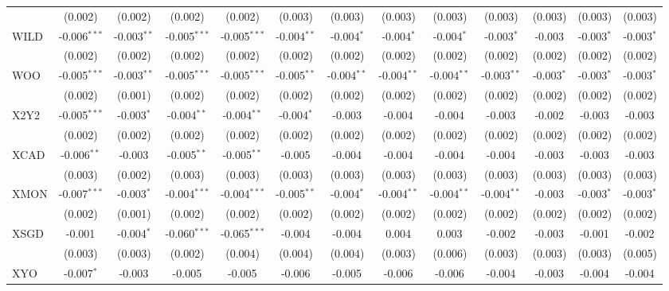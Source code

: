 \begin{table}[!htbp]
\begin{tabular}{@{\extracolsep{5pt}}lcccccccccccc}
  & (0.002) & (0.002) & (0.002) & (0.002) & (0.003) & (0.003) & (0.003) & (0.003) & (0.003) & (0.003) & (0.003) & (0.003) \\
 WILD & -0.006$^{***}$ & -0.003$^{**}$ & -0.005$^{***}$ & -0.005$^{***}$ & -0.004$^{**}$ & -0.004$^{*}$ & -0.004$^{*}$ & -0.004$^{*}$ & -0.003$^{*}$ & -0.003$^{}$ & -0.003$^{*}$ & -0.003$^{*}$ \\
  & (0.002) & (0.002) & (0.002) & (0.002) & (0.002) & (0.002) & (0.002) & (0.002) & (0.002) & (0.002) & (0.002) & (0.002) \\
 WOO & -0.005$^{***}$ & -0.003$^{**}$ & -0.005$^{***}$ & -0.005$^{***}$ & -0.005$^{**}$ & -0.004$^{**}$ & -0.004$^{**}$ & -0.004$^{**}$ & -0.003$^{**}$ & -0.003$^{*}$ & -0.003$^{*}$ & -0.003$^{*}$ \\
  & (0.002) & (0.001) & (0.002) & (0.002) & (0.002) & (0.002) & (0.002) & (0.002) & (0.002) & (0.002) & (0.002) & (0.002) \\
 X2Y2 & -0.005$^{***}$ & -0.003$^{*}$ & -0.004$^{**}$ & -0.004$^{**}$ & -0.004$^{*}$ & -0.003$^{}$ & -0.004$^{}$ & -0.004$^{}$ & -0.003$^{}$ & -0.002$^{}$ & -0.003$^{}$ & -0.003$^{}$ \\
  & (0.002) & (0.002) & (0.002) & (0.002) & (0.002) & (0.002) & (0.002) & (0.002) & (0.002) & (0.002) & (0.002) & (0.002) \\
 XCAD & -0.006$^{**}$ & -0.003$^{}$ & -0.005$^{**}$ & -0.005$^{**}$ & -0.005$^{}$ & -0.004$^{}$ & -0.004$^{}$ & -0.004$^{}$ & -0.004$^{}$ & -0.003$^{}$ & -0.003$^{}$ & -0.003$^{}$ \\
  & (0.003) & (0.002) & (0.003) & (0.003) & (0.003) & (0.003) & (0.003) & (0.003) & (0.003) & (0.003) & (0.003) & (0.003) \\
 XMON & -0.007$^{***}$ & -0.003$^{*}$ & -0.004$^{***}$ & -0.004$^{***}$ & -0.005$^{**}$ & -0.004$^{*}$ & -0.004$^{**}$ & -0.004$^{**}$ & -0.004$^{**}$ & -0.003$^{}$ & -0.003$^{*}$ & -0.003$^{*}$ \\
  & (0.002) & (0.001) & (0.002) & (0.002) & (0.002) & (0.002) & (0.002) & (0.002) & (0.002) & (0.002) & (0.002) & (0.002) \\
 XSGD & -0.001$^{}$ & -0.004$^{*}$ & -0.060$^{***}$ & -0.065$^{***}$ & -0.004$^{}$ & -0.004$^{}$ & 0.004$^{}$ & 0.003$^{}$ & -0.002$^{}$ & -0.003$^{}$ & -0.001$^{}$ & -0.002$^{}$ \\
  & (0.003) & (0.003) & (0.002) & (0.004) & (0.004) & (0.004) & (0.003) & (0.006) & (0.003) & (0.003) & (0.003) & (0.005) \\
 XYO & -0.007$^{*}$ & -0.003$^{}$ & -0.005$^{}$ & -0.005$^{}$ & -0.006$^{}$ & -0.005$^{}$ & -0.006$^{}$ & -0.006$^{}$ & -0.004$^{}$ & -0.003$^{}$ & -0.004$^{}$ & -0.004$^{}$ \\

\end{tabular}
\end{table}
